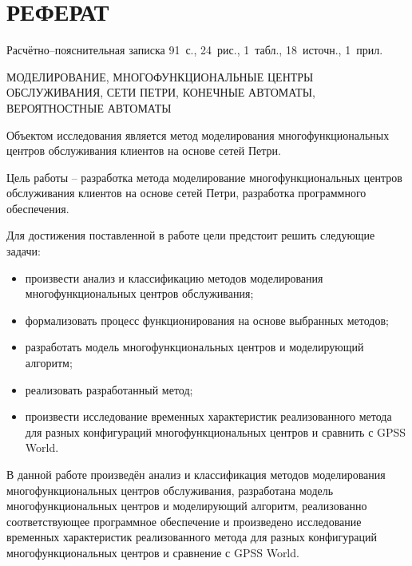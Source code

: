 \chapter*{РЕФЕРАТ}

Расчётно--пояснительная записка 91~с., 24~рис., 1~табл., 18~источн., 1~прил.

\noindent\MakeUppercase{моделирование, многофункциональные центры обслуживания, сети петри, конечные автоматы, вероятностные автоматы}

Объектом исследования является метод моделирования многофункциональных центров обслуживания клиентов на основе сетей Петри.

Цель работы -- разработка метода моделирование многофункциональных центров обслуживания клиентов на основе сетей Петри, разработка программного обеспечения.

Для достижения поставленной в работе цели предстоит решить следующие задачи:
\begin{itemize}[label=---]
	\item произвести анализ и классификацию методов моделирования многофункциональных центров обслуживания;
	\item формализовать процесс функционирования на основе выбранных методов;
	\item разработать модель многофункциональных центров и моделирующий алгоритм;
	\item реализовать разработанный метод; 
	\item произвести исследование временных характеристик реализованного метода для разных конфигураций многофункциональных центров и сравнить с GPSS World.
\end{itemize}

В данной работе произведён анализ и классификация методов моделирования многофункциональных центров обслуживания, разработана модель многофункциональных центров и моделирующий алгоритм, реализованно соответствующее программное обеспечение и произведено исследование временных характеристик реализованного метода для разных конфигураций многофункциональных центров и сравнение с GPSS World.


\setcounter{page}{5}